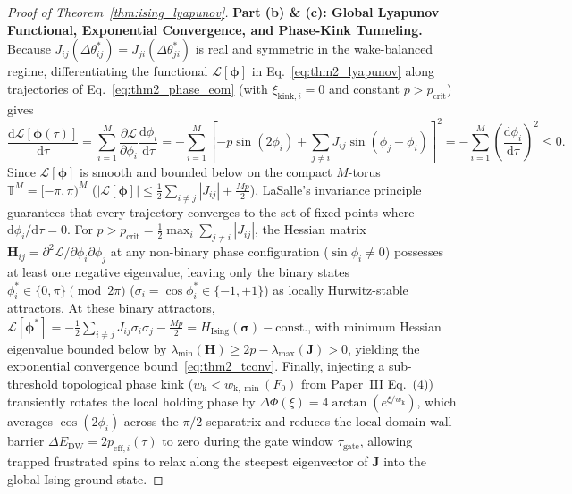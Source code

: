 \documentclass[11pt,letterpaper]{article}
\begin{document}
\begin{proof}[Proof of Theorem~\ref{thm:ising_lyapunov}]
\textbf{Part (b) \& (c): Global Lyapunov Functional, Exponential Convergence, and Phase-Kink Tunneling.}
Because $J_{ij}(\Delta\theta_{ij}^*) = J_{ji}(\Delta\theta_{ji}^*)$ is real and symmetric in the wake-balanced regime, differentiating the functional $\mathcal{L}[\bm{\phi}]$ in Eq.~\eqref{eq:thm2_lyapunov} along trajectories of Eq.~\eqref{eq:thm2_phase_eom} (with $\xi_{\mathrm{kink},i} = 0$ and constant $p > p_{\mathrm{crit}}$) gives
\begin{equation}
\frac{\mathrm{d}\mathcal{L}[\bm{\phi}(\tau)]}{\mathrm{d}\tau} = \sum_{i=1}^M \frac{\partial \mathcal{L}}{\partial \phi_i}\frac{\mathrm{d}\phi_i}{\mathrm{d}\tau} = -\sum_{i=1}^M \left[ -p\sin(2\phi_i) + \sum_{j\neq i}J_{ij}\sin(\phi_j - \phi_i) \right]^2 = -\sum_{i=1}^M \left(\frac{\mathrm{d}\phi_i}{\mathrm{d}\tau}\right)^2 \le 0.
\end{equation}
Since $\mathcal{L}[\bm{\phi}]$ is smooth and bounded below on the compact $M$-torus $\mathbb{T}^M = [-\pi, \pi)^M$ ($|\mathcal{L}[\bm{\phi}]| \le \frac{1}{2}\sum_{i\neq j}|J_{ij}| + \frac{M p}{2}$), LaSalle's invariance principle guarantees that every trajectory converges to the set of fixed points where $\mathrm{d}\phi_i/\mathrm{d}\tau = 0$. For $p > p_{\mathrm{crit}} = \frac{1}{2}\max_i\sum_{j\neq i}|J_{ij}|$, the Hessian matrix $\mathbf{H}_{ij} = \partial^2\mathcal{L}/\partial\phi_i\partial\phi_j$ at any non-binary phase configuration ($\sin\phi_i \neq 0$) possesses at least one negative eigenvalue, leaving only the binary states $\phi_i^* \in \{0, \pi\} \pmod{2\pi}$ ($\sigma_i = \cos\phi_i^* \in \{-1, +1\}$) as locally Hurwitz-stable attractors. At these binary attractors, $\mathcal{L}[\bm{\phi}^*] = -\frac{1}{2}\sum_{i\neq j}J_{ij}\sigma_i\sigma_j - \frac{M p}{2} = H_{\mathrm{Ising}}(\bm{\sigma}) - \text{const.}$, with minimum Hessian eigenvalue bounded below by $\lambda_{\min}(\mathbf{H}) \ge 2p - \lambda_{\max}(\mathbf{J}) > 0$, yielding the exponential convergence bound~\eqref{eq:thm2_tconv}. Finally, injecting a sub-threshold topological phase kink ($w_{\mathrm{k}} < w_{\mathrm{k},\min}(F_0)$ from Paper~III Eq.~(4)) transiently rotates the local holding phase by $\Delta\Phi(\xi) = 4\arctan(e^{\xi/w_{\mathrm{k}}})$, which averages $\cos(2\phi_i)$ across the $\pi/2$ separatrix and reduces the local domain-wall barrier $\Delta E_{\mathrm{DW}} = 2p_{\mathrm{eff},i}(\tau)$ to zero during the gate window $\tau_{\mathrm{gate}}$, allowing trapped frustrated spins to relax along the steepest eigenvector of $\mathbf{J}$ into the global Ising ground state.
\end{proof}
\end{document}
